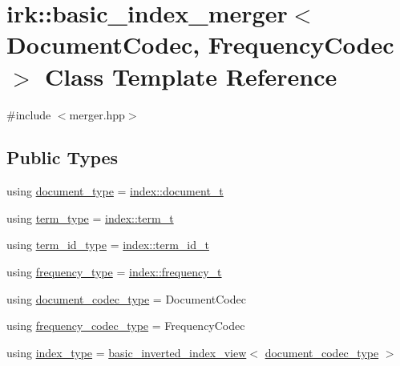 \hypertarget{classirk_1_1basic__index__merger}{}\section{irk\+:\+:basic\+\_\+index\+\_\+merger$<$ Document\+Codec, Frequency\+Codec $>$ Class Template Reference}
\label{classirk_1_1basic__index__merger}


{\ttfamily \#include $<$merger.\+hpp$>$}

\subsection*{Public Types}
\begin{DoxyCompactItemize}
\item 
using \mbox{\hyperlink{classirk_1_1basic__index__merger_a53640294a8d9edd9030e8900f5520716}{document\+\_\+type}} = \mbox{\hyperlink{namespaceirk_1_1index_af829dedea20da89f9b51b49d78f57006}{index\+::document\+\_\+t}}
\item 
using \mbox{\hyperlink{classirk_1_1basic__index__merger_af5d70e8a911f2b291337d008358fd15e}{term\+\_\+type}} = \mbox{\hyperlink{namespaceirk_1_1index_a7c2517c1f98e5b5f30ba3ab2f837caf6}{index\+::term\+\_\+t}}
\item 
using \mbox{\hyperlink{classirk_1_1basic__index__merger_ab264f391caf7e164305b87ede0ac0182}{term\+\_\+id\+\_\+type}} = \mbox{\hyperlink{namespaceirk_1_1index_ae2ce3a02969196fe6dab4443ed2007d5}{index\+::term\+\_\+id\+\_\+t}}
\item 
using \mbox{\hyperlink{classirk_1_1basic__index__merger_add1c7a6efe038b37d14899012dadf01a}{frequency\+\_\+type}} = \mbox{\hyperlink{namespaceirk_1_1index_aa2cb48e79abd95deb25bbdf36c0ea70f}{index\+::frequency\+\_\+t}}
\item 
using \mbox{\hyperlink{classirk_1_1basic__index__merger_af331ba6d7dd6d96484c6608f4236d8f1}{document\+\_\+codec\+\_\+type}} = Document\+Codec
\item 
using \mbox{\hyperlink{classirk_1_1basic__index__merger_aafab06bb9812cd99b8cf1ed9ac575074}{frequency\+\_\+codec\+\_\+type}} = Frequency\+Codec
\item 
using \mbox{\hyperlink{classirk_1_1basic__index__merger_a76f8b8ca41e8fa63480a0d2421578259}{index\+\_\+type}} = \mbox{\hyperlink{classirk_1_1basic__inverted__index__view}{basic\+\_\+inverted\+\_\+index\+\_\+view}}$<$ \mbox{\hyperlink{classirk_1_1basic__index__merger_af331ba6d7dd6d96484c6608f4236d8f1}{document\+\_\+codec\+\_\+type}} $>$
\end{DoxyCompactItemize}
